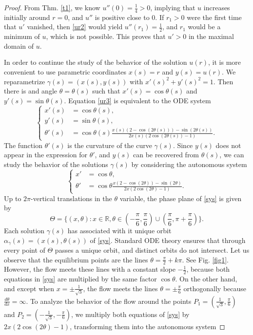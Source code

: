 \documentclass[10pt,a4paper]{amsart}
\def\r{\mathbb R}
\begin{document}
\begin{proof}
From Thm.   \ref{t1}, we know $u''(0)=\frac14>0$, implying  that $u$ increases initially around $r=0$, and $u''$ is positive close to $0$. If $r_1>0$ were the first time that $u'$ vanished, then \eqref{ur2} would yield $u''(r_1)=\frac12$, and $r_1$ would be a minimum of $u$, which is not possible. This proves that $u'>0$ in the maximal domain of $u$. 

In order to continue  the study of the behavior of the solution $u(r)$, it is more convenient to use  parametric coordinates   $x(s)=r$ and $y(s)=u(r)$. We reparametrize   $\gamma(s)=(x(s),y(s))$ with   $x'(s)^2+y'(s)^2=1$. Then   there is and angle $\theta=\theta(s)$ such that $x'(s)=\cos\theta(s)$ and $y'(s)=\sin\theta(s)$. Equation  \eqref{ur3} is equivalent to the ODE system
\begin{equation}\label{p1}
\left\{\begin{split}
x'(s)&=\cos\theta(s),\\
y'(s)&=\sin\theta(s),\\
\theta'(s)&=\cos\theta(s)\frac{x(s)(2-\cos(2\theta(s)))-\sin(2\theta(s))}{2x(s)(2\cos(2\theta(s))-1)}.
\end{split}\right.
\end{equation}
The function $\theta'(s)$ is the curvature of the curve $\gamma(s)$.  Since  $y(s)$ does not appear in the expression for $\theta'$, and   $y(s)$ can be recovered from $\theta(s)$, we can study the behavior of the solutions $\gamma(s)$ by considering the autonomous system 
\begin{equation}\label{sys}
\left\{\begin{split}
x'&=\cos\theta,\\
\theta'&=\cos\theta\frac{x(2-\cos(2\theta))-\sin(2\theta)}{2x(2\cos(2\theta)-1)}.
\end{split}\right.
\end{equation}
 Up to $2\pi$-vertical translations in the $\theta$ variable, the phase plane of \eqref{sys} is given by 
$$\Theta=\{(x,\theta)\colon x\in\r,\theta\in(-\frac{\pi}{6},\frac{\pi}{6})\cup (\frac{\pi}{6},\pi+\frac{\pi}{6})\}.$$
 Each solution $\gamma(s)$ has associated with it unique orbit $\alpha_\gamma(s)=(x(s),\theta(s))$ of \eqref{sys}. Standard ODE theory ensures that through every point of $\Theta$ passes a unique orbit, and distinct orbits do not intersect. Let us observe that the equilibrium points are the lines $\theta= \frac{\pi}{2}+k\pi$. See Fig. \ref{fig1}. However, the flow meets these lines with a constant slope  $-\frac12$, because both equations in \eqref{sys} are multiplied by the same factor $\cos\theta$. On the other hand, and except when $x=\pm \frac{1}{\sqrt{3}}$, the flow meets  the lines $\theta=\pm\frac{\pi}{6}$ orthogonally because $\frac{d\theta}{dx}=\infty$. To analyze the behavior of the flow around the points $P_1=(\frac{1}{\sqrt{3}},\frac{\pi}{6})$ and $P_2=(-\frac{1}{\sqrt{3}},-\frac{\pi}{6})$, we   multiply both equations of \eqref{sys}  by $2x(2\cos(2\theta)-1)$, transforming them into  the autonomous system 
 

\end{proof}
\end{document}
